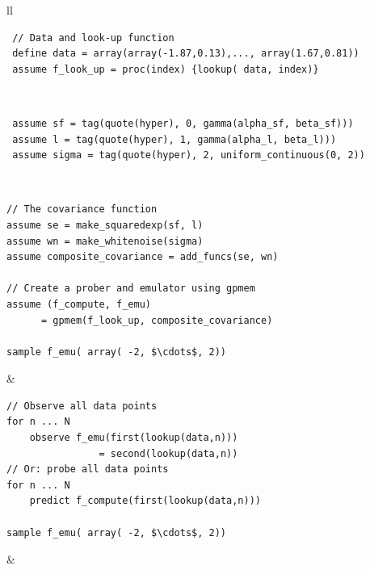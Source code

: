 \begin{tabular}{ll} \hline
{}
  \begin{minipage}{4cm}
  \begin{lstlisting}
 // Data and look-up function
 define data = array(array(-1.87,0.13),..., array(1.67,0.81)) 
 assume f_look_up = proc(index) {lookup( data, index)}
\end{lstlisting}
\end{minipage}\\
\hline
{}
  \begin{minipage}{4cm}
  \begin{lstlisting} 
 assume sf = tag(quote(hyper), 0, gamma(alpha_sf, beta_sf)))
 assume l = tag(quote(hyper), 1, gamma(alpha_l, beta_l)))
 assume sigma = tag(quote(hyper), 2, uniform_continuous(0, 2)) 
\end{lstlisting}
\end{minipage}
  \\
\hline

\begin{lstlisting}[mathescape,escapechar=\#]
// The covariance function
assume se = make_squaredexp(sf, l)
assume wn = make_whitenoise(sigma)
assume composite_covariance = add_funcs(se, wn)

// Create a prober and emulator using gpmem
assume (f_compute, f_emu)
      = gpmem(f_look_up, composite_covariance)

sample f_emu( array( -2, $\cdots$, 2)) 
\end{lstlisting}
 &    \\ \hline
 \begin{lstlisting}[mathescape,escapechar=\#]
// Observe all data points
for n ... N
    observe f_emu(first(lookup(data,n))) 
                = second(lookup(data,n))
// Or: probe all data points
for n ... N
    predict f_compute(first(lookup(data,n)))

sample f_emu( array( -2, $\cdots$, 2)) 
\end{lstlisting}
 &    \\ \hline


\end{tabular}
